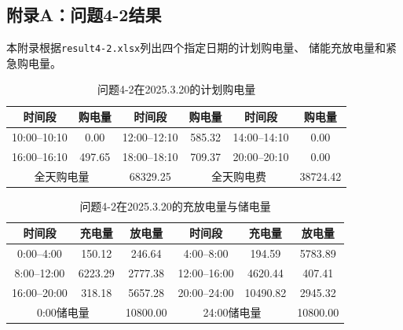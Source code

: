 \documentclass[UTF8]{ctexart}
\begin{document}
    \subsection*{附录A：问题4-2结果}
    
    本附录根据\texttt{result4-2.xlsx}列出四个指定日期的计划购电量、
    储能充放电量和紧急购电量。\par
    
    \begin{table}[htbp]
        \centering
        \caption{问题4-2在2025.3.20的计划购电量}
        \label{tab:q42_tenminute_0320}
        \begin{tabular}{cccccc}
            \toprule
            时间段 & 购电量 & 时间段 & 购电量 & 时间段 & 购电量 \\
            \midrule
            10:00--10:10 & 0.00 & 12:00--12:10 & 585.32 & 14:00--14:10 & 0.00 \\
            16:00--16:10 & 497.65 & 18:00--18:10 & 709.37 & 20:00--20:10 & 0.00 \\
            \midrule
            \multicolumn{2}{c}{全天购电量} & 68329.25 &
            \multicolumn{2}{c}{全天购电费} & 38724.42 \\
            \bottomrule
        \end{tabular}
    \end{table}
    
    \begin{table}[htbp]
        \centering
        \caption{问题4-2在2025.3.20的充放电量与储电量}
        \label{tab:q42_battery_0320}
        \begin{tabular}{cccccc}
            \toprule
            时间段 & 充电量 & 放电量 & 时间段 & 充电量 & 放电量 \\
            \midrule
            0:00--4:00 & 150.12 & 246.64 & 4:00--8:00 & 194.59 & 5783.89 \\
            8:00--12:00 & 6223.29 & 2777.38 & 12:00--16:00 & 4620.44 & 407.41 \\
            16:00--20:00 & 318.18 & 5657.28 & 20:00--24:00 & 10490.82 & 2945.32 \\
            \midrule
            \multicolumn{2}{c}{0:00储电量} & 10800.00 &
            \multicolumn{2}{c}{24:00储电量} & 10800.00 \\
            \bottomrule
        \end{tabular}
    \end{table}
    
\end{document}
